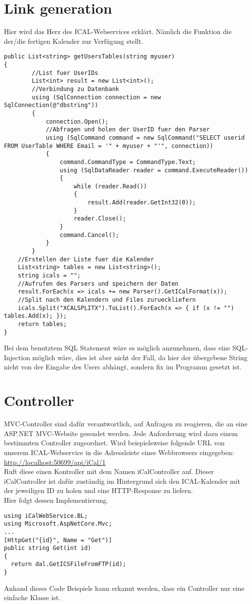 {\section{Link generation}
\label{sec:link}
Hier wird das Herz des ICAL-Webservices erklärt. Nämlich die Funktion die der/die fertigen Kalender zur Verfügung stellt.
\begin{lstlisting}
public List<string> getUsersTables(string myuser)
{
        //List fuer UserIDs
        List<int> result = new List<int>();
        //Verbindung zu Datenbank
        using (SqlConnection connection = new SqlConnection(@"dbstring"))
        {
            connection.Open();
            //Abfragen und holen der UserID fuer den Parser
            using (SqlCommand command = new SqlCommand("SELECT userid FROM UserTable WHERE Email = '" + myuser + "'", connection))
            {
                command.CommandType = CommandType.Text;
                using (SqlDataReader reader = command.ExecuteReader())
                {
                    while (reader.Read())
                    {
                        result.Add(reader.GetInt32(0));
                    }
                    reader.Close();
                }
                command.Cancel();
            }
        }
    //Erstellen der Liste fuer die Kalender
    List<string> tables = new List<string>();
    string icals = "";
    //Aufrufen des Parsers und speichern der Daten
    result.ForEach(x => icals += new Parser().GetICalFormat(x));
    //Split nach den Kalendern und Files zurueckliefern
    icals.Split("XCALSPLITX").ToList().ForEach(x => { if (x != "") tables.Add(x); });
    return tables;
}
\end{lstlisting}
Bei dem benutztem SQL Statement wäre es möglich anzunehmen, dass eine SQL-Injection möglich wäre, dies ist aber nicht der Fall, da hier der übergebene String nicht von der Eingabe des Users abhängt, sondern fix im Programm gesetzt ist.
\section{Controller}
\label{sec:Controller}
MVC-Controller sind dafür verantwortlich, auf Anfragen zu reagieren, die an eine ASP.NET MVC-Website gesendet werden. Jede Anforderung wird dazu einem bestimmten Controller zugeordnet. Wird beispielsweise folgende URL von unserem ICAL-Webservice in die Adressleiste eines Webbrowsers eingegeben:\\
\url{http://localhost:50699/api/iCal/1} \\
Ruft diese einen Kontroller mit dem Namen iCalController auf. Dieser iCalController ist dafür zuständig im Hintergrund sich den ICAL-Kalender mit der jeweiligen ID zu holen und eine HTTP-Response zu liefern.\\ Hier folgt dessen Implementierung. 
\begin{lstlisting}
using iCalWebService.BL;
using Microsoft.AspNetCore.Mvc;
...
[HttpGet("{id}", Name = "Get")]
public string Get(int id)
{
  return dal.GetICSFileFromFTP(id);
}
\end{lstlisting}
Anhand dieses Code Beispiels kann erkannt werden, dass ein Controller nur eine einfache Klasse ist. 
}
